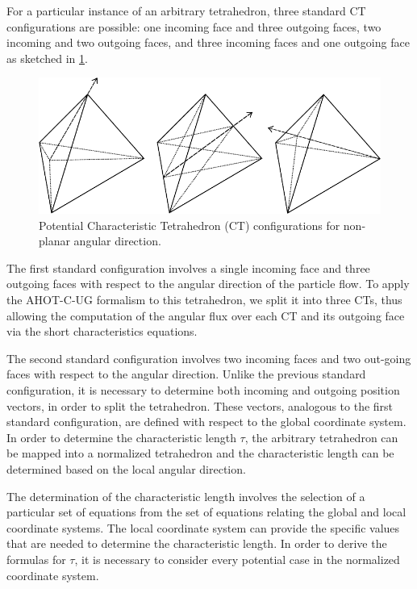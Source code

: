 For a particular instance of an arbitrary tetrahedron, three standard CT configurations are possible: one incoming face and three outgoing faces, two incoming and two outgoing faces, and three incoming faces and one outgoing face as sketched in \ref{fig:non_planar_CTs}.

\begin{figure}[th]
  \includegraphics[width=1.0\textwidth]{chapters/theory/figures/CT_configurations.pdf}
  \caption{Potential Characteristic Tetrahedron (CT) configurations for non-planar angular direction.}
  \label{fig:non_planar_CTs}
\end{figure}

The first standard configuration involves a single incoming face and three outgoing faces with respect to the angular direction of the particle flow. To apply the AHOT-C-UG formalism to this tetrahedron, we split it into three CTs, thus allowing the computation of the angular flux over each CT and its outgoing face via the short characteristics equations.

The second standard configuration involves two incoming faces and two out-going faces with respect to the angular direction. Unlike the previous standard configuration, it is necessary to determine both incoming and outgoing position vectors, in order to split the tetrahedron. These vectors, analogous to the first standard configuration, are defined with respect to the global coordinate system. In order to determine the characteristic length $\tau$, the arbitrary tetrahedron can be mapped into a normalized tetrahedron and the characteristic length can be determined based on the local angular direction.

The determination of the characteristic length involves the selection of a particular set of equations from the set of equations relating the global and local coordinate systems. The local coordinate system can provide the specific values that are needed to determine the characteristic length. In order to derive the formulas for $\tau$, it is necessary to consider every potential case in the normalized coordinate system.

